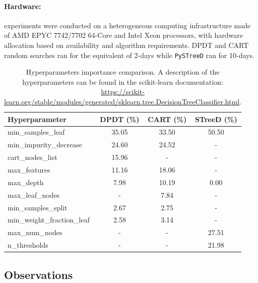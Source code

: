 \paragraph{Hardware:} experiments were conducted on a heterogeneous computing infrastructure made of AMD EPYC 7742/7702 64-Core and Intel Xeon processors, with hardware allocation based on availability and algorithm requirements. DPDT and CART random searches ran for the equivalent of 2-days while \texttt{PySTreeD} ran for 10-days.

\begin{table}
\centering
\small
\caption{Hyperparameters importance comparison. A description of the hyperparameters can be found in the scikit-learn documentation: \url{https://scikit-learn.org/stable/modules/generated/sklearn.tree.DecisionTreeClassifier.html}.}
\begin{tabular}{lccc}
\toprule
\textbf{Hyperparameter} & \textbf{DPDT (\%)}  & \textbf{CART (\%)} & \textbf{STreeD (\%)} \\
\midrule
min\_samples\_leaf & 35.05 & 33.50 & 50.50 \\
min\_impurity\_decrease & 24.60 & 24.52 & - \\
cart\_nodes\_list & 15.96 & - & - \\
max\_features & 11.16 & 18.06 & - \\
max\_depth & 7.98 & 10.19 & 0.00 \\
max\_leaf\_nodes & - & 7.84 & - \\
min\_samples\_split & 2.67 & 2.75 & - \\
min\_weight\_fraction\_leaf & 2.58 & 3.14 & - \\
max\_num\_nodes & - & - & 27.51 \\
n\_thresholds & - & - & 21.98 \\
\bottomrule
\end{tabular}
\label{tab:importance_comparison}
\end{table}

\subsection{Observations}


